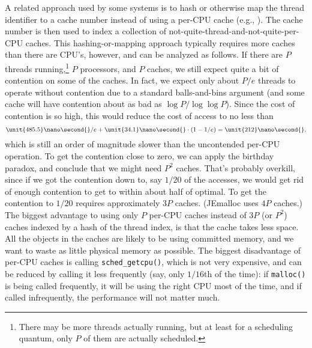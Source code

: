 \documentclass[natbib,sort&compress]{sigplanconf}
\newcommand{\code}[1]{\texttt{#1}}
\newcommand{\ns}[1]{\unit{#1}\nano\second{}}
\begin{document}
A related approach used by some systems is to hash or otherwise map
the thread identifier to a cache number instead of using a per-CPU
cache (e.g., \cite{LarsonKr98, Evans06}).  The cache number is then
used to index a collection of not-quite-thread-and-not-quite-per-CPU
caches.  This hashing-or-mapping approach typically requires more
caches than there are CPU's, however, and can be analyzed as follows.
If there are $P$ threads running,\footnote{There may be more threads
  actually running, but at least for a scheduling quantum, only $P$ of
  them are actually scheduled.} $P$ processors, and $P$ caches, we
still expect quite a bit of contention on some of the caches.  In
fact, we expect only about $P/e$ threads to operate without contention
due to a standard balls-and-bins argument (and some cache will have
contention about as bad as $\log P/\log\log P$).  Since the cost of
contention is so high, this would reduce the cost of access to no less
than
\[ \ns{485.5}/e + \ns{34.1}\cdot(1-1/e) = \ns{212},\]
which is still an order of magnitude slower than the uncontended
per-CPU operation.  To get the contention close to zero, we can apply
the birthday paradox, and conclude that we might need $P^2$ caches.
That's probably overkill, since if we got the contention down to, say
$1/20$ of the accesses, we would get rid of enough contention to get
to within about half of optimal.  To get the contention to $1/20$
requires approximately $3P$ caches.  (JEmalloc uses $4P$ caches.)  The
biggest advantage to using only $P$ per-CPU caches instead of $3P$ (or
$P^2$) caches indexed by a hash of the thread index, is that the cache
takes less space.  All the objects in the caches are likely to be
using committed memory, and we want to waste as little physical memory
as possible.  The biggest disadvantage of per-CPU caches is calling
\code{sched_getcpu()}, which is not very expensive, and can be reduced
by calling it less frequently (say, only $1/16$th of the time): if
\texttt{malloc()} is being called frequently, it will be using the
right CPU most of the time, and if called infrequently, the
performance will not matter much.
\end{document}
